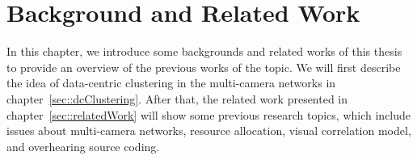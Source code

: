 \section{Background and Related Work}
\label{sec::backgroundAndRelatedWork}
In this chapter, we introduce some backgrounds and related works of this thesis to provide an overview of the previous works of the topic.
We will first describe the idea of data-centric clustering in the multi-camera networks in chapter~\ref{sec::dcClustering}.
After that, the related work presented in chapter~\ref{sec::relatedWork} will show some previous research topics, which include issues about multi-camera networks, resource allocation, visual correlation model, and overhearing source coding.

